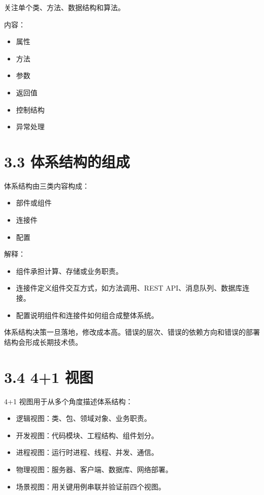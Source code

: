 \documentclass[UTF8,zihao=-4]{ctexart}
\begin{document}
关注单个类、方法、数据结构和算法。

内容：

\begin{itemize}
\item 属性
\item 方法
\item 参数
\item 返回值
\item 控制结构
\item 异常处理
\end{itemize}

\section{3.3 体系结构的组成}

体系结构由三类内容构成：

\begin{itemize}
\item 部件或组件
\item 连接件
\item 配置
\end{itemize}

解释：

\begin{itemize}
\item 组件承担计算、存储或业务职责。
\item 连接件定义组件交互方式，如方法调用、REST API、消息队列、数据库连接。
\item 配置说明组件和连接件如何组合成整体系统。
\end{itemize}

体系结构决策一旦落地，修改成本高。错误的层次、错误的依赖方向和错误的部署结构会形成长期技术债。

\section{3.4 4+1 视图}

4+1 视图用于从多个角度描述体系结构：

\begin{itemize}
\item 逻辑视图：类、包、领域对象、业务职责。
\item 开发视图：代码模块、工程结构、组件划分。
\item 进程视图：运行时进程、线程、并发、通信。
\item 物理视图：服务器、客户端、数据库、网络部署。
\item 场景视图：用关键用例串联并验证前四个视图。
\end{itemize}
\end{document}
